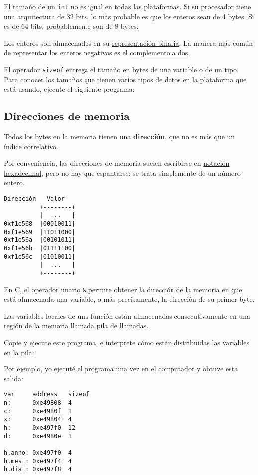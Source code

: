 El tamaño de un \lstinline!int! no es igual en todas las plataformas. Si
su procesador tiene una arquitectura de 32 bits, lo más probable es que
los enteros sean de 4 bytes. Si es de 64 bits, probablemente son de 8
bytes.

Los enteros son almacenados en su
\href{http://en.wikipedia.org/wiki/Binary\_numeral\_system}{representación
binaria}. La manera más común de representar los enteros negativos es el
\href{http://en.wikipedia.org/wiki/Two's\_complement}{complemento a
dos}.

El operador \lstinline!sizeof! entrega el tamaño en bytes de una
variable o de un tipo. Para conocer los tamaños que tienen varios tipos
de datos en la plataforma que está usando, ejecute el siguiente
programa:

\subsection{Direcciones de memoria}

Todos los bytes en la memoria tienen una \textbf{dirección}, que no es
más que un índice correlativo.

Por conveniencia, las direcciones de memoria suelen escribirse en
\href{http://en.wikipedia.org/wiki/Hexadecimal}{notación hexadecimal},
pero no hay que espantarse: se trata simplemente de un número entero.

\begin{verbatim}
Dirección   Valor
          +--------+
          |  ...   |
0xf1e568  |00010011|
0xf1e569  |11011000|
0xf1e56a  |00101011|
0xf1e56b  |01111100|
0xf1e56c  |01010011|
          |  ...   |
          +--------+
\end{verbatim}

En C, el operador unario \lstinline!&! permite obtener la dirección de
la memoria en que está almacenada una variable, o más precisamente, la
dirección de su primer byte.

Las variables locales de una función están almacenadas consecutivamente
en una región de la memoria llamada
\href{http://es.wikipedia.org/wiki/Pila\_de\_llamadas}{pila de
llamadas}.

Copie y ejecute este programa, e interprete cómo están distribuidas las
variables en la pila:

Por ejemplo, yo ejecuté el programa una vez en el computador y obtuve
esta salida:

\begin{verbatim}
var     address   sizeof
n:      0xe49808  4
c:      0xe4980f  1
x:      0xe49804  4
h:      0xe497f0  12
d:      0xe4980e  1

h.anno: 0xe497f0  4
h.mes : 0xe497f4  4
h.dia : 0xe497f8  4
\end{verbatim}

